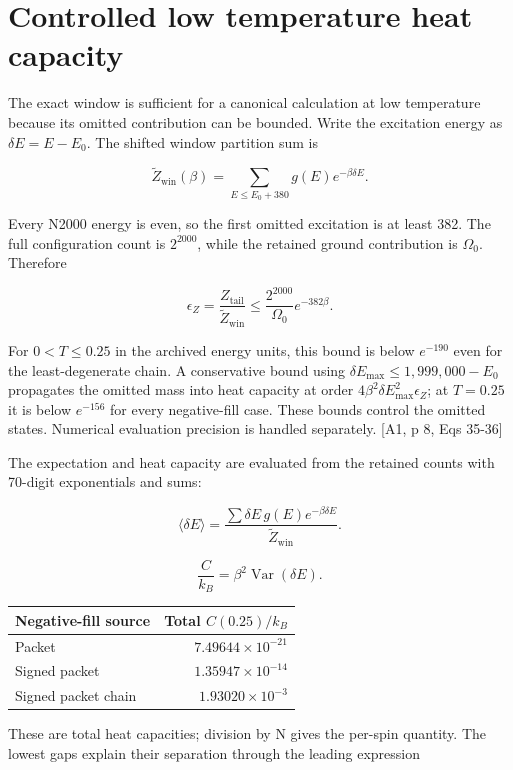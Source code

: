 \section{Controlled low temperature heat capacity}\label{controlled-low-temperature-heat-capacity}

The exact window is sufficient for a canonical calculation at low temperature because its omitted contribution can be bounded. Write the excitation energy as \(\delta E=E-E_0\). The shifted window partition sum is

\[\widetilde Z_{\mathrm{win}}(\beta)=\sum_{E\leq E_0+380}g(E)e^{-\beta\delta E}.\]

Every N2000 energy is even, so the first omitted excitation is at least 382. The full configuration count is \(2^{2000}\), while the retained ground contribution is \(\Omega_0\). Therefore

\[\epsilon_Z=\frac{Z_{\mathrm{tail}}}{\widetilde Z_{\mathrm{win}}}\leq\frac{2^{2000}}{\Omega_0}e^{-382\beta}.\]

For \(0<T\leq0.25\) in the archived energy units, this bound is below \(e^{-190}\) even for the least-degenerate chain. A conservative bound using \(\delta E_{\max}\leq1,999,000-E_0\) propagates the omitted mass into heat capacity at order \(4\beta^2\delta E_{\max}^2\epsilon_Z\); at \(T=0.25\) it is below \(e^{-156}\) for every negative-fill case. These bounds control the omitted states. Numerical evaluation precision is handled separately. {[}A1, p 8, Eqs 35-36{]}

The expectation and heat capacity are evaluated from the retained counts with 70-digit exponentials and sums:

\[\langle\delta E\rangle=\frac{\sum\delta E\,g(E)e^{-\beta\delta E}}{\widetilde Z_{\mathrm{win}}}.\]

\[\frac{C}{k_B}=\beta^2\operatorname{Var}(\delta E).\]

\begin{longtable}[]{@{}lr@{}}
\toprule\noalign{}
Negative-fill source & Total \(C(0.25)/k_B\) \\
\midrule\noalign{}
\endhead
\bottomrule\noalign{}
\endlastfoot
Packet & \(7.49644\times10^{-21}\) \\
Signed packet & \(1.35947\times10^{-14}\) \\
Signed packet chain & \(1.93020\times10^{-3}\) \\
\end{longtable}

These are total heat capacities; division by N gives the per-spin quantity. The lowest gaps explain their separation through the leading expression

